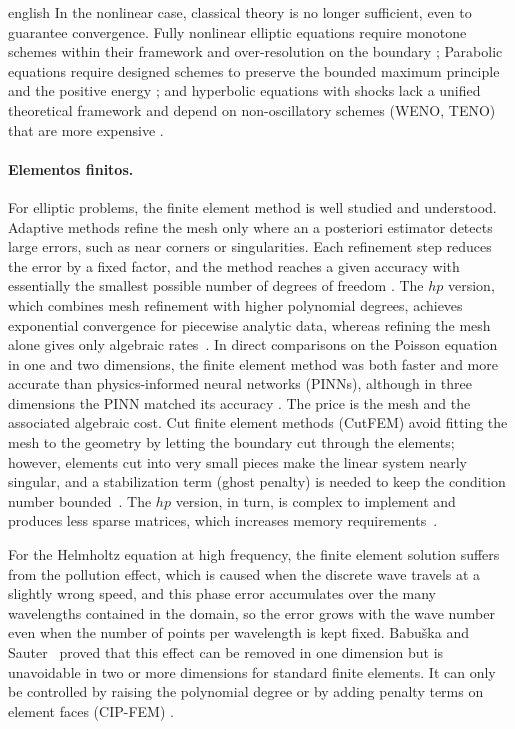 \documentclass[../0000.tex]{subfiles}
\begin{document}
\begin{hyphenrules}{english}
In the nonlinear case, classical theory is no longer sufficient, even to guarantee convergence. Fully nonlinear elliptic equations require monotone schemes within their 
framework and over-resolution on the boundary \cite{hamfeldt2022convergent,neilan2019monge,del2022finite}; Parabolic equations require designed schemes to preserve the 
bounded maximum principle and the positive energy \cite{hou2023linear,qin2026second,del2023finite}; and hyperbolic equations with shocks lack a unified theoretical 
framework and depend on non-oscillatory schemes (WENO, TENO) that are more expensive \cite{tadmor2012review,fu2023review}.

\paragraph{Elementos finitos.}

For elliptic problems, the finite element method is well studied and understood. Adaptive methods refine the mesh only where an a posteriori estimator detects 
large errors, such as near corners or singularities. Each refinement step reduces the error by a fixed factor, and the method reaches a given accuracy with 
essentially the smallest possible number of degrees of freedom \cite{bonito2024adaptive}. The $hp$ version, which combines mesh refinement with higher polynomial degrees, 
achieves exponential convergence for piecewise analytic data, whereas refining the mesh alone gives only algebraic rates~\cite{babuvska1994p}. In direct 
comparisons on the Poisson equation in one and two dimensions, the finite element method was both faster and more accurate than physics-informed neural networks 
(PINNs), although in three dimensions the PINN matched its accuracy \cite{grossmann2024can}. The price is the mesh and the associated algebraic cost. Cut finite element methods (CutFEM) avoid fitting the mesh to the geometry by letting the boundary
cut through the elements; however, elements cut into very small pieces make the linear system nearly singular, and a stabilization term (ghost penalty) is
needed to keep the condition number bounded~\cite{burman2025cut}. The $hp$ version, in turn, is complex to implement and produces less sparse matrices,
which increases memory requirements~\cite{babuvska1994p}.

For the Helmholtz equation at high frequency, the finite element solution suffers from the pollution effect, which is caused when the discrete wave travels at a 
slightly wrong speed, and this phase error accumulates over the many wavelengths contained in the domain, so the error grows with the wave number even when the number 
of points per wavelength is kept fixed. Babu\v{s}ka and Sauter~\cite{babuska1997pollution} proved that this effect can be removed in one dimension but is 
unavoidable in two or more dimensions for standard finite elements. It can only be controlled by raising the polynomial degree or by adding penalty terms on 
element faces (CIP-FEM) \cite{li2019fem,galkowski2026numerical}.


\end{hyphenrules}
\end{document}
